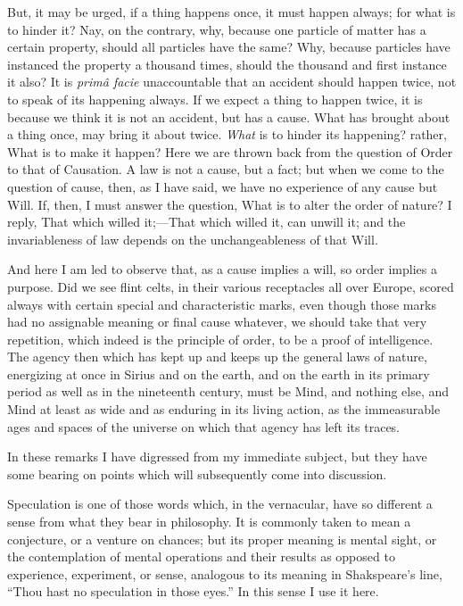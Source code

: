 But, it may be urged, if a thing happens once, it must happen
always; for what is to hinder it? Nay, on the contrary, why, because
one particle of matter has a certain property, should all particles
have the same? Why, because particles have instanced the property a
thousand times, should the thousand and first instance it also? It is \emph{primâ
facie} unaccountable that an accident should happen twice, not to
speak of its happening always. If we expect a thing to happen
twice, it is because we think it is not an accident, but has a cause.
What has brought about a thing once, may bring it about twice. \emph{What}
is to hinder its happening? rather, What is to make it happen? Here we
are thrown back from the question of Order to that of Causation. A law
is not a cause, but a fact; but when we come to the question of cause,
then, as I have said, we have no experience of any cause but Will. If,
then, I must answer the question, What is to alter the order of
nature? I reply, That which willed it;—That which willed it, can
unwill it; and the invariableness of law depends on the
unchangeableness of that Will.

And here I am led to observe that, as a cause implies a will, so
order implies a purpose. Did we see flint celts, in their various
receptacles all over Europe, scored always with certain special and
characteristic marks, even though those marks had no assignable
meaning or final cause whatever, we should take that very repetition,
which indeed is the principle of order, to be a proof of intelligence.
The agency then which has kept up and keeps up the general laws of
nature, energizing at once in Sirius and on the earth, and on the
earth in its primary period as well as in the nineteenth century, must
be Mind, and nothing else, and Mind at least as wide and as enduring
in its living action, as the immeasurable ages and spaces of the
universe on which that agency has left its traces.

In these remarks I have digressed from my immediate subject, but
they have some bearing on points which will subsequently come into
discussion.


Speculation is one of those words which, in the vernacular, have so
different a sense from what they bear in philosophy. It is commonly
taken to mean a conjecture, or a venture on chances; but its proper
meaning is mental sight, or the contemplation of mental operations and
their results as opposed to experience, experiment, or sense,
analogous to its meaning in Shakspeare's line, ``Thou hast no
speculation in those eyes.'' In this sense I use it here.

